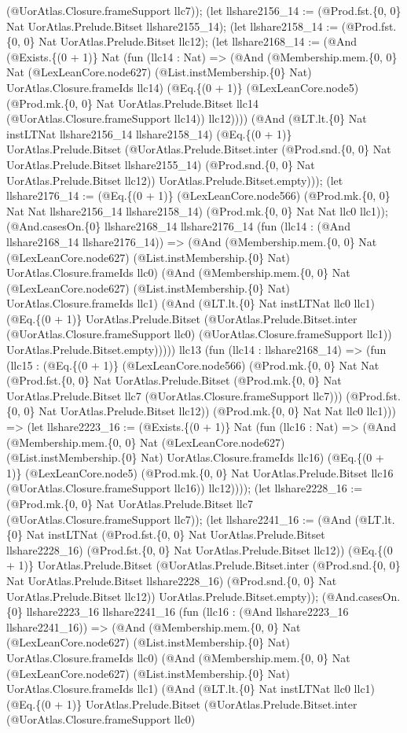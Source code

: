 \documentclass[11pt]{article}
\begin{document}
(@UorAtlas.Closure.frameSupport llc7)); (let llshare2156\_14 := (@Prod.fst.\{0, 0\} Nat UorAtlas.Prelude.Bitset llshare2155\_14); (let llshare2158\_14 := (@Prod.fst.\{0, 0\} Nat UorAtlas.Prelude.Bitset llc12); (let llshare2168\_14 := (@And (@Exists.\{(0 + 1)\} Nat (fun (llc14 : Nat) => (@And (@Membership.mem.\{0, 0\} Nat (@LexLeanCore.node627) (@List.instMembership.\{0\} Nat) UorAtlas.Closure.frameIds llc14) (@Eq.\{(0 + 1)\} (@LexLeanCore.node5) (@Prod.mk.\{0, 0\} Nat UorAtlas.Prelude.Bitset llc14 (@UorAtlas.Closure.frameSupport llc14)) llc12)))) (@And (@LT.lt.\{0\} Nat instLTNat llshare2156\_14 llshare2158\_14) (@Eq.\{(0 + 1)\} UorAtlas.Prelude.Bitset (@UorAtlas.Prelude.Bitset.inter (@Prod.snd.\{0, 0\} Nat UorAtlas.Prelude.Bitset llshare2155\_14) (@Prod.snd.\{0, 0\} Nat UorAtlas.Prelude.Bitset llc12)) UorAtlas.Prelude.Bitset.empty))); (let llshare2176\_14 := (@Eq.\{(0 + 1)\} (@LexLeanCore.node566) (@Prod.mk.\{0, 0\} Nat Nat llshare2156\_14 llshare2158\_14) (@Prod.mk.\{0, 0\} Nat Nat llc0 llc1)); (@And.casesOn.\{0\} llshare2168\_14 llshare2176\_14 (fun (llc14 : (@And llshare2168\_14 llshare2176\_14)) => (@And (@Membership.mem.\{0, 0\} Nat (@LexLeanCore.node627) (@List.instMembership.\{0\} Nat) UorAtlas.Closure.frameIds llc0) (@And (@Membership.mem.\{0, 0\} Nat (@LexLeanCore.node627) (@List.instMembership.\{0\} Nat) UorAtlas.Closure.frameIds llc1) (@And (@LT.lt.\{0\} Nat instLTNat llc0 llc1) (@Eq.\{(0 + 1)\} UorAtlas.Prelude.Bitset (@UorAtlas.Prelude.Bitset.inter (@UorAtlas.Closure.frameSupport llc0) (@UorAtlas.Closure.frameSupport llc1)) UorAtlas.Prelude.Bitset.empty))))) llc13 (fun (llc14 : llshare2168\_14) => (fun (llc15 : (@Eq.\{(0 + 1)\} (@LexLeanCore.node566) (@Prod.mk.\{0, 0\} Nat Nat (@Prod.fst.\{0, 0\} Nat UorAtlas.Prelude.Bitset (@Prod.mk.\{0, 0\} Nat UorAtlas.Prelude.Bitset llc7 (@UorAtlas.Closure.frameSupport llc7))) (@Prod.fst.\{0, 0\} Nat UorAtlas.Prelude.Bitset llc12)) (@Prod.mk.\{0, 0\} Nat Nat llc0 llc1))) => (let llshare2223\_16 := (@Exists.\{(0 + 1)\} Nat (fun (llc16 : Nat) => (@And (@Membership.mem.\{0, 0\} Nat (@LexLeanCore.node627) (@List.instMembership.\{0\} Nat) UorAtlas.Closure.frameIds llc16) (@Eq.\{(0 + 1)\} (@LexLeanCore.node5) (@Prod.mk.\{0, 0\} Nat UorAtlas.Prelude.Bitset llc16 (@UorAtlas.Closure.frameSupport llc16)) llc12)))); (let llshare2228\_16 := (@Prod.mk.\{0, 0\} Nat UorAtlas.Prelude.Bitset llc7 (@UorAtlas.Closure.frameSupport llc7)); (let llshare2241\_16 := (@And (@LT.lt.\{0\} Nat instLTNat (@Prod.fst.\{0, 0\} Nat UorAtlas.Prelude.Bitset llshare2228\_16) (@Prod.fst.\{0, 0\} Nat UorAtlas.Prelude.Bitset llc12)) (@Eq.\{(0 + 1)\} UorAtlas.Prelude.Bitset (@UorAtlas.Prelude.Bitset.inter (@Prod.snd.\{0, 0\} Nat UorAtlas.Prelude.Bitset llshare2228\_16) (@Prod.snd.\{0, 0\} Nat UorAtlas.Prelude.Bitset llc12)) UorAtlas.Prelude.Bitset.empty)); (@And.casesOn.\{0\} llshare2223\_16 llshare2241\_16 (fun (llc16 : (@And llshare2223\_16 llshare2241\_16)) => (@And (@Membership.mem.\{0, 0\} Nat (@LexLeanCore.node627) (@List.instMembership.\{0\} Nat) UorAtlas.Closure.frameIds llc0) (@And (@Membership.mem.\{0, 0\} Nat (@LexLeanCore.node627) (@List.instMembership.\{0\} Nat) UorAtlas.Closure.frameIds llc1) (@And (@LT.lt.\{0\} Nat instLTNat llc0 llc1) (@Eq.\{(0 + 1)\} UorAtlas.Prelude.Bitset (@UorAtlas.Prelude.Bitset.inter (@UorAtlas.Closure.frameSupport llc0) 
\end{document}

